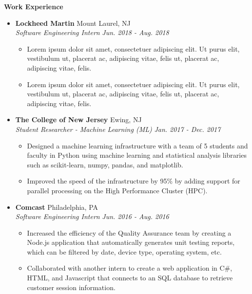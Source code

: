 \documentclass[letterpaper,10pt]{article}
\newcommand{\resitem}[1]{\item #1 \vspace{-2pt}}
\newcommand{\resheading}[1]{{\large \colorbox{mygrey}{\begin{minipage}{\textwidth}{\textbf{#1 \vphantom{p\^{E}}}}\end{minipage}}}}
\newcommand{\ressubheading}[4]{%
  \item\textbf{#1} \hfill #2\null\\
  \textit{#3} \hfill \textit{#4}%
  \vspace{-5pt}
}%
\begin{document}
\resheading{Work Experience}
\begin{itemize}
\ressubheading{Lockheed Martin}{Mount Laurel, NJ}{Software Engineering Intern}{Jun. 2018 - Aug. 2018}
	\begin{itemize}
		\resitem{Lorem ipsum dolor sit amet, consectetuer adipiscing elit. Ut purus elit, vestibulum ut, placerat ac, adipiscing vitae, felis ut, placerat ac, adipiscing vitae, felis.}
		\resitem{Lorem ipsum dolor sit amet, consectetuer adipiscing elit. Ut purus elit, vestibulum ut, placerat ac, adipiscing vitae, felis ut, placerat ac, adipiscing vitae, felis.}
		\end{itemize}	

\ressubheading{The College of New Jersey}{Ewing, NJ}{Student Researcher - Machine Learning (ML)}{Jan. 2017 - Dec. 2017}
	\begin{itemize}
		\resitem{Designed a machine learning infrastructure with a team of 5 students and faculty in Python using machine learning and statistical analysis libraries such as scikit-learn, numpy, pandas, and matplotlib.}
		\resitem{Improved the speed of the infrastructure by 95\% by adding support for parallel processing on the High Performance Cluster (HPC).}
		\end{itemize}

\ressubheading{Comcast}{Philadelphia, PA}{Software Engineering Intern}{Jun. 2016 - Aug. 2016}
	\begin{itemize}
		\resitem{Increased the efficiency of the Quality Assurance team by creating a Node.js application that automatically generates unit testing reports, which can be filtered by date, device type, operating system, etc.}
		\resitem{Collaborated with another intern to create a web application in C\#, HTML, and Javascript that connects to an SQL database to retrieve customer session information.}
	\end{itemize}
\end{itemize}
\end{document}
